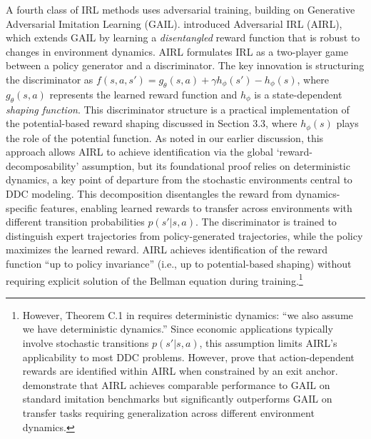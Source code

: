 A fourth class of IRL methods uses adversarial training, building on Generative Adversarial Imitation Learning (GAIL). \citet{fu:2018} introduced Adversarial IRL (AIRL), which extends GAIL by learning a {\it disentangled\/} reward function that is robust to changes in environment dynamics. AIRL formulates IRL as a two-player game between a policy generator and a discriminator. The key innovation is structuring the discriminator as $f(s,a,s') = g_\theta(s,a) + \gamma h_\phi(s') - h_\phi(s)$, where $g_\theta(s,a)$ represents the learned reward function and $h_\phi$ is a state-dependent {\it shaping function\/}. This discriminator structure is a practical implementation of the potential-based reward shaping discussed in Section 3.3, where $h_\phi(s)$ plays the role of the potential function. As noted in our earlier discussion, this approach allows AIRL to achieve identification via the global `reward-decomposability' assumption, but its foundational proof relies on deterministic dynamics, a key point of departure from the stochastic environments central to DDC modeling. This decomposition disentangles the reward from dynamics-specific features, enabling learned rewards to transfer across environments with different transition probabilities $p(s'|s,a)$. The discriminator is trained to distinguish expert trajectories from policy-generated trajectories, while the policy maximizes the learned reward. AIRL achieves identification of the reward function ``up to policy invariance'' (i.e., up to potential-based shaping) without requiring explicit solution of the Bellman equation during training.\footnote{\footnotesize However, Theorem C.1 in \citet{fu:2018} requires deterministic dynamics: ``we also assume we have deterministic dynamics.'' Since economic applications typically involve stochastic transitions $p(s'|s,a)$, this assumption limits AIRL's applicability to most DDC problems. However, \citet{lee:2026} prove that action-dependent rewards are identified within AIRL when constrained by an exit anchor. \citet{fu:2018} demonstrate that AIRL achieves comparable performance to GAIL on standard imitation benchmarks but significantly outperforms GAIL on transfer tasks requiring generalization across different environment dynamics.}

